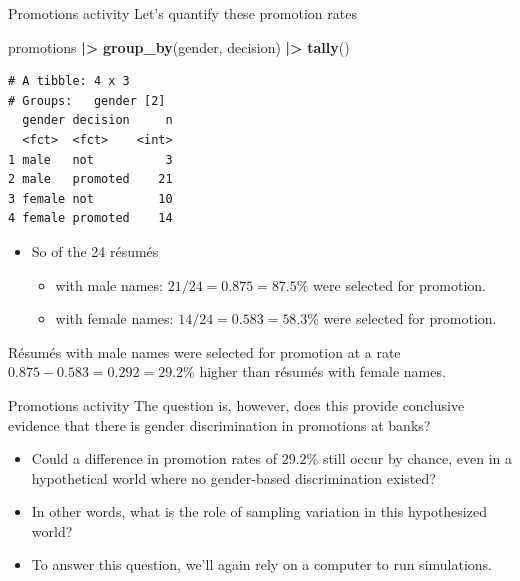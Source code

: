 \documentclass[
  ignorenonframetext,
]{beamer}
\newenvironment{Shaded}{\begin{snugshade}}{\end{snugshade}}
\newcommand{\FunctionTok}[1]{\textcolor[rgb]{0.13,0.29,0.53}{\textbf{#1}}}
\newcommand{\NormalTok}[1]{#1}
\newcommand{\SpecialCharTok}[1]{\textcolor[rgb]{0.81,0.36,0.00}{\textbf{#1}}}
\providecommand{\tightlist}{%
  \setlength{\itemsep}{0pt}\setlength{\parskip}{0pt}}
\begin{document}
\begin{frame}[fragile]{Promotions activity}
\protect\hypertarget{promotions-activity-4}{}
Let's quantify these promotion rates

\tiny

\begin{Shaded}
\begin{Highlighting}[]
\NormalTok{promotions }\SpecialCharTok{|\textgreater{}} 
  \FunctionTok{group\_by}\NormalTok{(gender, decision) }\SpecialCharTok{|\textgreater{}} 
  \FunctionTok{tally}\NormalTok{()}
\end{Highlighting}
\end{Shaded}

\begin{verbatim}
# A tibble: 4 x 3
# Groups:   gender [2]
  gender decision     n
  <fct>  <fct>    <int>
1 male   not          3
2 male   promoted    21
3 female not         10
4 female promoted    14
\end{verbatim}

\normalsize

\begin{itemize}
\item
  So of the 24 résumés

  \begin{itemize}
  \tightlist
  \item
    with male names: \(21/24=0.875=87.5\%\) were selected for promotion.
  \item
    with female names: \(14/24=0.583=58.3\%\) were selected for
    promotion.
  \end{itemize}
\end{itemize}

Résumés with male names were selected for promotion at a rate
\(0.875 -0.583 = 0.292 = 29.2\%\) higher than résumés with female names.
\end{frame}

\begin{frame}{Promotions activity}
\protect\hypertarget{promotions-activity-5}{}
The question is, however, does this provide conclusive evidence that
there is gender discrimination in promotions at banks?

\begin{itemize}
\item
  Could a difference in promotion rates of \(29.2\%\) still occur by
  chance, even in a hypothetical world where no gender-based
  discrimination existed?
\item
  In other words, what is the role of sampling variation in this
  hypothesized world?
\item
  To answer this question, we'll again rely on a computer to run
  simulations.
\end{itemize}
\end{frame}
\end{document}
